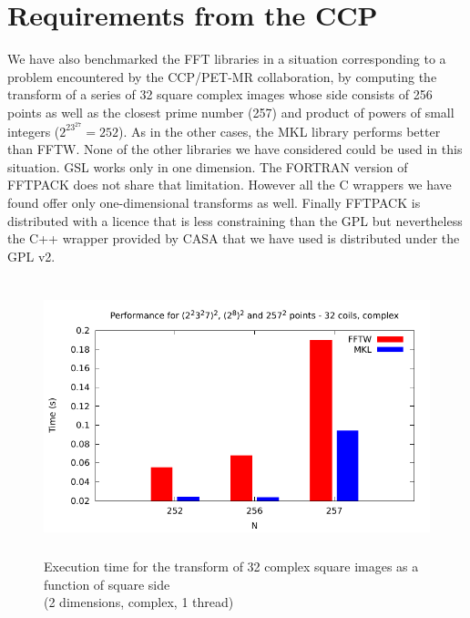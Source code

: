 \documentclass[12pt, a4paper]{article}
\begin{document}
\section{Requirements from the CCP}
We have also benchmarked the FFT libraries in a situation corresponding to a problem encountered by the CCP/PET-MR collaboration, by computing the transform of a series of 32 square complex images whose side consists of 256 points as well as the closest prime number (257) and product of powers of small integers ($2^23^27=252$). As in the other cases, the MKL library performs better than FFTW. None of the other libraries we have considered could be used in this situation. GSL works only in one dimension. The FORTRAN version of FFTPACK does not share that limitation. However all the C wrappers we have found offer only one-dimensional transforms as well. Finally FFTPACK is distributed with a licence that is less constraining than the GPL but nevertheless the C++ wrapper provided by CASA that we have used is distributed under the GPL v2.

\begin{figure}[H]
\captionsetup{width=0.6\textwidth}
\centering
\includegraphics[height=8cm]{graphs/ccp/ccp.pdf}
\caption{Execution time for the transform of 32 complex square images as a function of square side\\(2 dimensions, complex, 1 thread)}
\label{method}
\end{figure}
\end{document}
